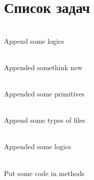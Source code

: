 \chapter{Список задач}
\hypertarget{todo}{}\label{todo}

\begin{DoxyRefList}
\item[Пространство имен \doxylink{namespace_graphic_editor_1_1_documents}{Graphic\+Editor\+::Documents} ]\hfill \\
\label{todo__todo000002}%
%
Append some logics  
\item[Пространство имен \doxylink{namespace_graphic_editor_1_1_g_u_i}{Graphic\+Editor\+::GUI} ]\hfill \\
\label{todo__todo000006}%
%
Appended somethink new  
\item[Пространство имен \doxylink{namespace_graphic_editor_1_1_primitives}{Graphic\+Editor\+::Primitives} ]\hfill \\
\label{todo__todo000005}%
%
Appended some primitives  
\item[Пространство имен \doxylink{namespace_graphic_editor_1_1_type_of_files}{Graphic\+Editor\+::Type\+Of\+Files} ]\hfill \\
\label{todo__todo000003}%
%
Append some types of files  
\item[Пространство имен \doxylink{namespace_graphic_editor_1_1_writers}{Graphic\+Editor\+::Writers} ]\hfill \\
\label{todo__todo000004}%
%
Appended some logics  
\item[Файл \doxylink{_main_8cpp}{Main.cpp} ]\hfill \\
\label{todo__todo000001}%
%
Put some code in methods 
\end{DoxyRefList}